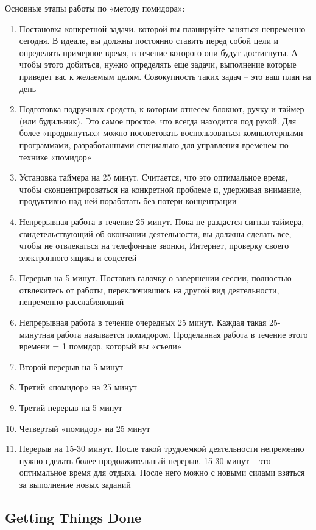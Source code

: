 \documentclass{../industrial-development}
\begin{document}
\lecturenotes

Основные этапы работы по «методу помидора»:
\begin{enumerate}
  \item Постановка конкретной задачи, которой вы планируйте заняться непременно сегодня. В идеале, вы должны постоянно ставить перед собой цели и определять примерное время, в течение которого они будут достигнуты. А чтобы этого добиться, нужно определять еще задачи,  выполнение которые приведет вас к желаемым целям.  Совокупность таких задач – это ваш план на день
  \item Подготовка подручных средств, к которым отнесем блокнот, ручку и таймер (или будильник). Это самое простое, что всегда находится под рукой. Для более «продвинутых» можно посоветовать воспользоваться компьютерными программами, разработанными специально для управления временем по технике «помидор»
  \item Установка таймера на 25 минут. Считается, что это оптимальное время, чтобы сконцентрироваться на конкретной проблеме и, удерживая внимание, продуктивно над ней поработать без потери концентрации
  \item Непрерывная работа в течение 25 минут. Пока не раздастся сигнал таймера, свидетельствующий об окончании деятельности, вы должны сделать все, чтобы не отвлекаться на телефонные звонки, Интернет, проверку своего электронного ящика и соцсетей
  \item Перерыв на 5 минут. Поставив галочку о завершении сессии, полностью отвлекитесь от работы, переключившись на другой вид деятельности, непременно расслабляющий
  \item Непрерывная работа в течение очередных 25 минут. Каждая такая 25-минутная работа называется помидором. Проделанная работа в течение этого времени = 1 помидор, который вы «съели»
  \item Второй перерыв на 5 минут
  \item Третий «помидор» на 25 минут
  \item Третий перерыв на 5 минут
  \item Четвертый «помидор» на 25 минут
  \item Перерыв на 15-30 минут. После такой трудоемкой деятельности непременно нужно сделать более продолжительный перерыв. 15-30 минут – это оптимальное время для отдыха. После него можно с новыми силами взяться за выполнение новых заданий~\cite{Pomidoro}
\end{enumerate}

\subsection{Getting Things Done}
\end{document}
